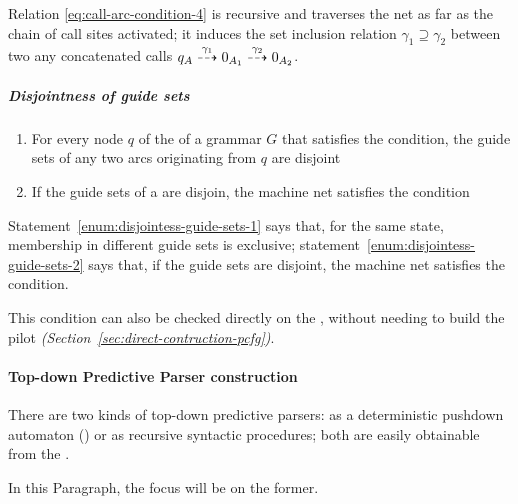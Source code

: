 \documentclass[english]{article}
\begin{document}
Relation \ref{eq:call-arc-condition-4} is recursive and traverses the net as far as the chain of call sites activated;
it induces the set inclusion relation \(\gamma_1 \supseteq \gamma_2\) between two any concatenated calls \(q_A \stackrel{\gamma_1}{\dashrightarrow} 0_{A_1} \stackrel{\gamma_2}{\dashrightarrow} 0_{A_2}\).

\subparagraph*{Disjointness of guide sets}

\begin{enumerate}[label=\arabic*., ref=(\arabic*)]
  \item\label{enum:disjointess-guide-sets-1} For every node \(q\) of the \PCFG of a grammar \(G\) that satisfies the \ello condition, the guide sets of any two arcs originating from \(q\) are disjoint
  \item\label{enum:disjointess-guide-sets-2} If the guide sets of a \PCFG are disjoin, the machine net satisfies the \ello condition
\end{enumerate}

\bigskip
Statement~\ref{enum:disjointess-guide-sets-1} says that, for the same state, membership in different guide sets is exclusive;
statement~\ref{enum:disjointess-guide-sets-2} says that, if the guide sets are disjoint, the machine net satisfies the \ello condition.

This condition can also be checked directly on the \PCFG, without needing to build the \elro pilot \textit{(Section~\ref{sec:direct-contruction-pcfg})}.

\paragraph{Top-down Predictive Parser construction}
\label{par:top-down-predictive-parser-construction}

There are two kinds of top-down predictive parsers:
as a deterministic pushdown automaton (\DPDA) or as recursive syntactic procedures;
both are easily obtainable from the \PCFG.

In this Paragraph, the focus will be on the former.
\end{document}
